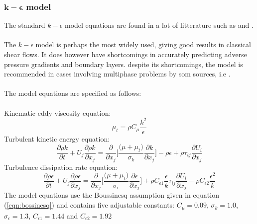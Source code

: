 \documentclass[a4paper, 12pt]{report}
\begin{document}
\subsubsection{$\boldsymbol{k}-\boldsymbol{\epsilon}$ model}
The standard $k-\epsilon$ model equations are found in a lot of litterature such as \cite{CFD} and \cite{UNIK4900}.\\
\\
The $k-\epsilon$ model is perhaps the most widely used, giving good results in classical shear flows. It does however have shortcomings in accurately predicting adverse pressure gradients and boundary layers. despite its shortcomings, the model is recommended in cases involving multiphase problems by som sources, i.e \cite{AppliedMathematicalModelling}.\\
\\ 
The model equations are specified as follows:\\
\\
Kinematic eddy viscosity equation:
\begin{equation}
\mu_t = \rho C_{\mu}\frac{k^2}{\epsilon}
\label{eqn:nutKEpsilon}
\end{equation}
Turbulent kinetic energy equation:
\begin{equation}
\frac{\partial \rho k}{\partial t} + U_j \frac{\partial \rho k}{\partial x_j} = \frac{\partial}{\partial x_j}\Big[\frac{\big( \mu + \mu_t\big)}{\sigma_k}\frac{\partial k}{\partial x_j}\Big] - \rho \epsilon + \rho\tau_{ij}\frac{\partial U_i}{\partial x_j}
\label{eqn:kInKEpsilon}
\end{equation}
Turbulence dissipation rate equation:
\begin{equation}
\frac{\partial \rho \epsilon }{\partial t} + U_j\frac{\partial \rho \epsilon}{\partial x_j} =\frac{\partial }{\partial x_j}\Big[\frac{\big(\mu + \mu_t\big)}{\sigma_{\epsilon}}\frac{\partial \epsilon}{\partial x_j} \Big]  + \rho C_{\epsilon 1}\frac{\epsilon}{k}\tau_{ij}\frac{\partial U_i}{\partial x_j} - \rho C_{\epsilon 2} \frac{\epsilon ^2}{k}
\label{eqn:epsilonInKEpsilon}
\end{equation}
The model equations use the Boussinesq assumption given in equation (\ref{eqn:bossinesq}) and contains five adjustable constants: $C_{\mu}=0.09$, $\sigma_k=1.0$, $\sigma_{\epsilon}= 1.3$, $C_{\epsilon 1}=1.44$ and $C_{\epsilon 2}=1.92$
\end{document}
